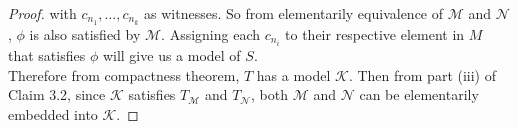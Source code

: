 \documentclass{article}
\begin{document}
\begin{enumerate}
\begin{proof}
    with $c_{n_1},\ldots,c_{n_k}$ as witnesses. So from elementarily
    equivalence of $\mathcal{M}$ and $\mathcal{N}$, $\phi$ is also
    satisfied by $\mathcal{M}$. Assigning each $c_{n_i}$ to their respective
    element in $M$ that satisfies $\phi$ will give us a model of $S$. \\

    Therefore from compactness theorem, $T$ has a model $\mathcal{K}$. Then
    from part (iii) of Claim 3.2, since $\mathcal{K}$ satisfies
    $T_\mathcal{M}$ and $T_\mathcal{N}$, both $\mathcal{M}$ and
    $\mathcal{N}$ can be elementarily embedded into $\mathcal{K}$.
  \end{proof}
\end{enumerate}
\end{document}
